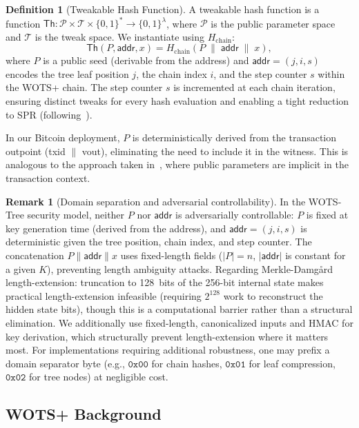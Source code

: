 \documentclass[11pt,a4paper]{article}
\theoremstyle{definition}
\newtheorem{definition}[theorem]{Definition}
\newtheorem{remark}[theorem]{Remark}
\begin{document}
\begin{definition}[Tweakable Hash Function]
\label{def:th}
A tweakable hash function is a function $\mathsf{Th} : \mathcal{P} \times \mathcal{T} \times \{0,1\}^* \to \{0,1\}^\lambda$, where $\mathcal{P}$ is the public parameter space and $\mathcal{T}$ is the tweak space. We instantiate using $H_{\mathrm{chain}}$:
$$
\mathsf{Th}(P, \mathsf{addr}, x) = H_{\mathrm{chain}}(P \;\|\; \mathsf{addr} \;\|\; x),
$$
where $P$ is a public seed (derivable from the address) and $\mathsf{addr} = (j, i, s)$ encodes the tree leaf position $j$, the chain index $i$, and the step counter $s$ within the WOTS+ chain. The step counter $s$ is incremented at each chain iteration, ensuring distinct tweaks for every hash evaluation and enabling a tight reduction to SPR (following~\cite{hulsing2013wots}).
\end{definition}

In our Bitcoin deployment, $P$ is deterministically derived from the transaction outpoint (txid $\|$ vout), eliminating the need to include it in the witness. This is analogous to the approach taken in~\cite{kudinov2025}, where public parameters are implicit in the transaction context.

\begin{remark}[Domain separation and adversarial controllability]
In the WOTS-Tree security model, neither $P$ nor $\mathsf{addr}$ is adversarially controllable: $P$ is fixed at key generation time (derived from the address), and $\mathsf{addr} = (j, i, s)$ is deterministic given the tree position, chain index, and step counter. The concatenation $P \| \mathsf{addr} \| x$ uses fixed-length fields ($|P| = n$, $|\mathsf{addr}|$ is constant for a given $K$), preventing length ambiguity attacks. Regarding Merkle-Damg\aa rd length-extension: truncation to 128~bits of the 256-bit internal state makes practical length-extension infeasible (requiring $2^{128}$ work to reconstruct the hidden state bits), though this is a computational barrier rather than a structural elimination. We additionally use fixed-length, canonicalized inputs and HMAC for key derivation, which structurally prevent length-extension where it matters most. For implementations requiring additional robustness, one may prefix a domain separator byte (e.g., $\mathtt{0x00}$ for chain hashes, $\mathtt{0x01}$ for leaf compression, $\mathtt{0x02}$ for tree nodes) at negligible cost.
\end{remark}

\subsection{WOTS+ Background}
\label{sec:wots-background}
\end{document}
